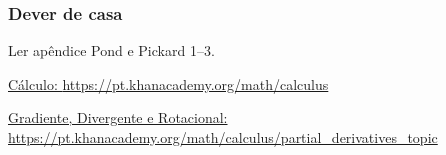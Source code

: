 \begin{frame}
\frametitle{Dever de casa}
    \begin{block}{}
      Ler apêndice Pond e Pickard 1--3.
    \end{block}

    \begin{block}{}
      \href{https://pt.khanacademy.org/math/calculus}{Cálculo: \url{https://pt.khanacademy.org/math/calculus}} 
    \end{block}

    \begin{block}{}
      \href{https://pt.khanacademy.org/math/calculus/partial_derivatives_topic}{Gradiente, Divergente e Rotacional: \url{https://pt.khanacademy.org/math/calculus/partial_derivatives_topic}}
    \end{block}
\end{frame}


